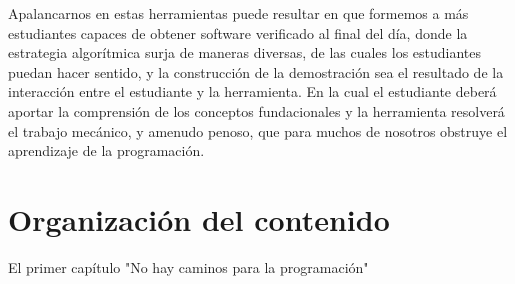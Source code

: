 \documentclass[12pt, a4paper, openany, fleqn]{book}
\begin{document}
    Apalancarnos en estas herramientas puede resultar en que formemos a más estudiantes capaces de obtener software verificado al final del día, donde la estrategia algorítmica surja de maneras diversas, de las cuales los estudiantes puedan hacer sentido, y la construcción de la demostración sea el resultado de la interacción entre el estudiante y la herramienta. En la cual el estudiante deberá aportar la comprensión de los conceptos fundacionales y la herramienta resolverá el trabajo mecánico, y amenudo penoso, que para muchos de nosotros obstruye el aprendizaje de la programación.

    \chapter{Organización del contenido}
    El primer capítulo "No hay caminos para la programación" 
    
    
\end{document}
